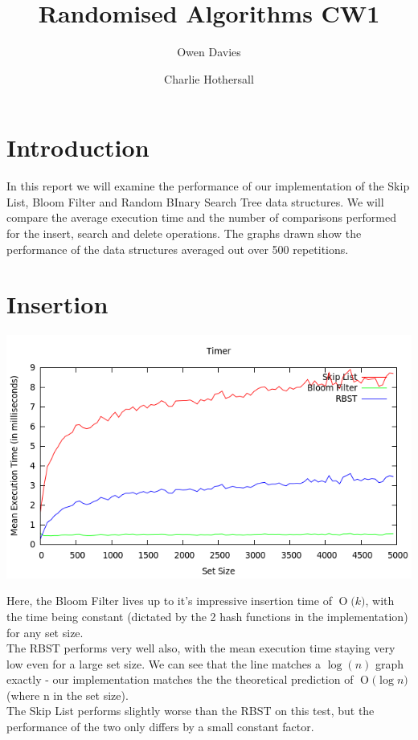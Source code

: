 \documentclass[11pt, notitlepage]{report}
\title{Randomised Algorithms CW1}
\date{}
\author{Owen Davies \and Charlie Hothersall}
\newcommand{\BigO}[1]{\ensuremath{\operatorname{O}\bigl(#1\bigr)}}
\begin{document}
\maketitle

\section*{Introduction}

In this report we will examine the performance of our implementation of the Skip List, Bloom Filter and Random BInary Search Tree data structures. We will compare the average execution time and the number of comparisons performed for the insert, search and delete operations. The graphs drawn show the performance of the data structures averaged out over 500 repetitions.

\section*{Insertion}

\includegraphics[width=\textwidth]{img/Timer-Add}

Here, the Bloom Filter lives up to it's impressive insertion time of \BigO{k}, with the time being constant (dictated by the 2 hash functions in the implementation) for any set size.\\

The RBST performs very well also, with the mean execution time staying very low even for a large set size. We can see that the line matches a $\log(n)$ graph exactly - our implementation matches the the theoretical prediction of \BigO{\log n} (where n in the set size).\\

The Skip List performs slightly worse than the RBST on this test, but the performance of the two only differs by a small constant factor.
\end{document}
